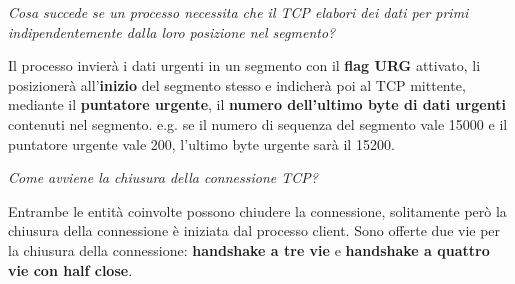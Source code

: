 \documentclass[11pt,a4paper,oneside]{book}
\theoremstyle{definition}
\begin{document}
\begin{flushleft}
	\textit{Cosa succede se un processo necessita che il TCP elabori dei dati per primi indipendentemente dalla loro posizione nel segmento?}
\end{flushleft}
Il processo invierà i dati urgenti in un segmento con il \textbf{flag URG} attivato, li posizionerà all'\textbf{inizio} del segmento stesso e indicherà poi al TCP mittente, mediante il \textbf{puntatore urgente}, il \textbf{numero dell'ultimo byte di dati urgenti} contenuti nel segmento. e.g. se il numero di sequenza del segmento vale 15000 e il puntatore urgente vale 200, l'ultimo byte urgente sarà il 15200.

\pagebreak

\begin{flushleft}
	\textit{Come avviene la chiusura della connessione TCP?}
\end{flushleft}
Entrambe le entità coinvolte possono chiudere la connessione, solitamente però la chiusura della connessione è iniziata dal processo client. Sono offerte due vie per la chiusura della connessione: \textbf{handshake a tre vie} e \textbf{handshake a quattro vie con half close}.
\end{document}
